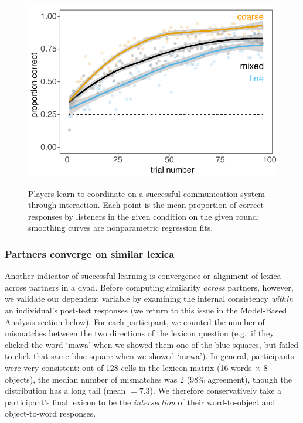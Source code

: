 \documentclass[10pt,letterpaper]{article}
\begin{document}
\begin{figure}[t]
\begin{center}
{\includegraphics[scale=0.65]{accuracyByCondition_edited.pdf}}
{\caption{\footnotesize{Players learn to coordinate on a successful communication system through interaction. Each point is the mean proportion of correct responses by listeners in the given condition on the given round; smoothing curves are nonparametric regression fits.  %
\label{fig:accuracy}}}}
\vspace{-.5cm}
\end{center}
\end{figure}

\subsubsection{Partners converge on similar lexica}

Another indicator of successful learning is convergence or alignment of lexica across partners in a dyad. Before computing similarity \emph{across} partners, however, we validate our dependent variable by examining the internal consistency \emph{within} an individual's post-test responses (we return to this issue in the Model-Based Analysis section below). For each participant, we counted the number of mismatches between the two directions of the lexicon question (e.g.\ if they clicked the word `mawa' when we showed them one of the blue squares, but failed to click that same blue square when we showed `mawa'). In general, participants were very consistent: out of 128 cells in the lexicon matrix (16 words $\times$ 8 objects), the median number of mismatches was 2 (98\% agreement), though the distribution has a long tail (mean $= 7.3$). We therefore conservatively take a participant's final lexicon to be the \emph{intersection} of their word-to-object and object-to-word responses.
\end{document}
